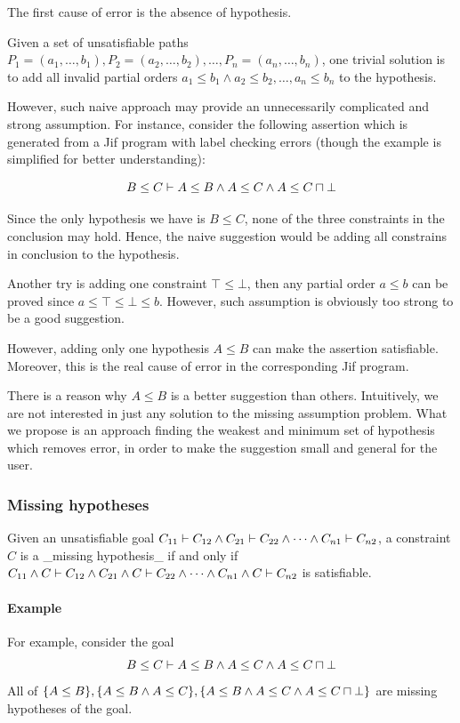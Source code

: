 The first cause of error is the absence of hypothesis.

Given a set of unsatisfiable paths $P_1 = (a_1, \dots, b_1), P_2 = (a_2, \dots,
b_2), \dots,  P_n = (a_n, \dots, b_n)$, one trivial solution is to add all
invalid partial orders $a_1\leq b_1 \land a_2\leq b_2, \dots, a_n\leq b_n$ to
the hypothesis.

However, such naive approach may provide an unnecessarily complicated and
strong assumption. For instance, consider the following assertion which is
generated from a Jif program with label checking errors (though the example is
simplified for better understanding): 

\[B\leq C \vdash A\leq B \land A\leq C \land A\leq C\sqcap \bot \]

Since the only hypothesis we have is $B\leq C$, none of the three constraints
in the conclusion may hold. Hence, the naive suggestion would be adding all
constrains in conclusion to the hypothesis.

Another try is adding one constraint $\top\leq \bot$, then any partial order $a
\leq b$ can be proved since $a\leq \top\leq \bot\leq b$. However, such
assumption is obviously too strong to be a good suggestion.

However, adding only one hypothesis $A\leq B$ can make the assertion
satisfiable. Moreover, this is the real cause of error in the corresponding Jif
program.

There is a reason why $A\leq B$ is a better suggestion than others.
Intuitively, we are not interested in just any solution to the missing
assumption problem. What we propose is an approach finding the weakest and
minimum set of hypothesis which removes error, in order to make the suggestion
small and general for the user.

\subsubsection{Missing hypotheses}

Given an unsatisfiable goal $C_{11} \vdash C_{12} \land C_{21} \vdash C_{22}
\land \dots \land C_{n1} \vdash C_{n2}$, a constraint $C$ is a _missing
hypothesis_ if and only if $C_{11} \land C \vdash C_{12} \land C_{21} \land C
\vdash C_{22} \land \dots \land C_{n1} \land C \vdash C_{n2}$ is
satisfiable.

\paragraph{Example} For example, consider the goal
\[B\leq C \vdash A\leq B \land A\leq C \land A\leq C\sqcap \bot \]
All of $\{A\leq B\}, \{A\leq B \land A\leq C\}, \{A\leq B \land A\leq C \land
A\leq C\sqcap \bot\}$ are missing hypotheses of the goal.

